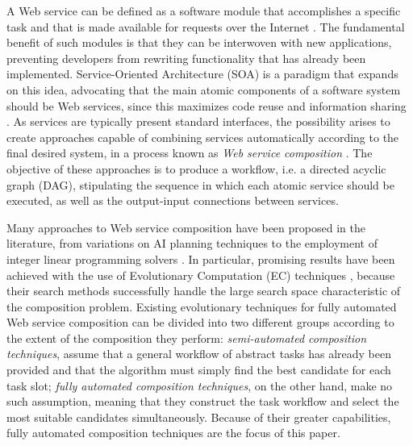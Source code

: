 \documentclass{article}
\begin{document}
A Web service can be defined as a software module that accomplishes a specific task and that is made available for requests over
the Internet \cite{gottschalk2002introduction}. The fundamental benefit of such modules is that they can be interwoven with new applications, preventing developers from rewriting
functionality that has already been implemented. Service-Oriented Architecture (SOA) is a paradigm that expands on this idea, advocating
that the main atomic components of a software system should be Web services, since this maximizes code reuse and information sharing \cite{perrey2003service}.
As services are typically present standard interfaces, the possibility arises to create approaches capable of combining services
automatically according to the final desired system, in a process known as \textit{Web service composition} \cite{milanovic2004current}. The objective of these approaches
is to produce a workflow, i.e. a directed acyclic graph (DAG), stipulating the sequence in which each atomic service should be executed, as well as
the output-input connections between services.

Many approaches to Web service composition have been proposed in the literature, from variations on AI planning techniques \cite{deng2013efficient} to the employment
of integer linear programming solvers \cite{yoo2008web}. In particular, promising results have been achieved with the use of Evolutionary Computation (EC) techniques \cite{wang2012survey},
because their search methods successfully handle the large search space characteristic of the composition problem. Existing evolutionary
techniques for fully automated Web service composition can be divided into two different groups according to the extent of the composition they
perform: \textit{semi-automated composition techniques}, assume that a general workflow of abstract tasks has already been provided and that the
algorithm must simply find the best candidate for each task slot; \textit{fully automated composition techniques}, on the other hand, make no such
assumption, meaning that they construct the task workflow and select the most suitable candidates simultaneously. Because of their greater capabilities,
fully automated composition techniques are the focus of this paper.
\end{document}
